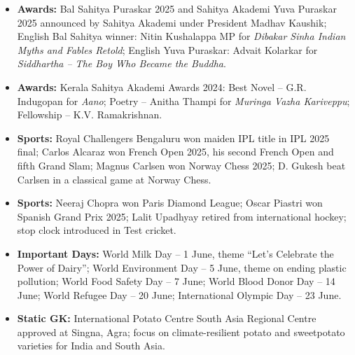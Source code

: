 \documentclass[10pt,a4paper]{article}
\begin{document}
\begin{itemize}
    \item \textbf{Awards:} Bal Sahitya Puraskar 2025 and Sahitya Akademi Yuva Puraskar 2025 announced by Sahitya Akademi under President Madhav Kaushik; English Bal Sahitya winner: Nitin Kushalappa MP for \textit{Dibakar Sinha Indian Myths and Fables Retold}; English Yuva Puraskar: Advait Kolarkar for \textit{Siddhartha -- The Boy Who Became the Buddha}.
    \item \textbf{Awards:} Kerala Sahitya Akademi Awards 2024: Best Novel -- G.R. Indugopan for \textit{Aano}; Poetry -- Anitha Thampi for \textit{Muringa Vazha Kariveppu}; Fellowship -- K.V. Ramakrishnan.
    \item \textbf{Sports:} Royal Challengers Bengaluru won maiden IPL title in IPL 2025 final; Carlos Alcaraz won French Open 2025, his second French Open and fifth Grand Slam; Magnus Carlsen won Norway Chess 2025; D. Gukesh beat Carlsen in a classical game at Norway Chess.
    \item \textbf{Sports:} Neeraj Chopra won Paris Diamond League; Oscar Piastri won Spanish Grand Prix 2025; Lalit Upadhyay retired from international hockey; stop clock introduced in Test cricket.
    \item \textbf{Important Days:} World Milk Day -- 1 June, theme ``Let's Celebrate the Power of Dairy''; World Environment Day -- 5 June, theme on ending plastic pollution; World Food Safety Day -- 7 June; World Blood Donor Day -- 14 June; World Refugee Day -- 20 June; International Olympic Day -- 23 June.
    \item \textbf{Static GK:} International Potato Centre South Asia Regional Centre approved at Singna, Agra; focus on climate-resilient potato and sweetpotato varieties for India and South Asia.
\end{itemize}
\end{document}
